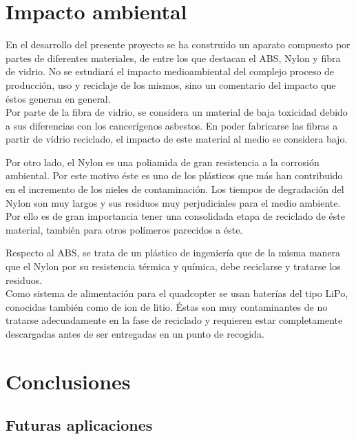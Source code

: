 \documentclass[twoside,11pt]{report}
\begin{document}
\newpage

\chapter{Impacto ambiental} \label{impacto}

En el desarrollo del presente proyecto se ha construido un aparato  compuesto por partes de diferentes materiales, de entre los que destacan el ABS, Nylon y fibra de vidrio. No se estudiará el  impacto medioambiental del complejo proceso de producción, uso y reciclaje de los mismos, sino un comentario del impacto que éstos generan en general. \\

Por parte de la fibra de vidrio, se considera un material de baja toxicidad debido a sus diferencias con los cancerígenos asbestos. En poder fabricarse las fibras a partir de vídrio reciclado, el impacto de este material al medio se considera bajo.

Por otro lado, el Nylon es una poliamida de gran resistencia a la corrosión ambiental. Por este motivo éste es uno de los plásticos que más han contribuido en el incremento de los nieles de contaminación. Los tiempos de degradación del Nylon son muy largos y sus residuos muy perjudiciales para el medio ambiente. Por ello es de gran importancia tener una consolidada etapa de reciclado de éste material, también para otros polímeros parecidos a éste.

Respecto al ABS, se trata de un plástico de ingeniería que de la misma manera que el Nylon por su resistencia térmica y química, debe reciclarse y tratarse los residuos. \\

Como sistema de alimentación para el quadcopter se usan baterías del tipo LiPo, conocidas también como de ion de litio. Éstas son muy contaminantes de no tratarse adecuadamente en la fase de reciclado y requieren estar completamente descargadas antes de ser entregadas en un punto de recogida.

\newpage

\chapter{Conclusiones} \label{conclusiones}

\section*{Futuras aplicaciones}
\end{document}
